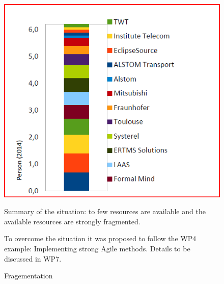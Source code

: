 \documentclass[a4paper, 11pt]{article}
\begin{document}
\begin{itemize}
\begin{figure}
\includegraphics[width=\textwidth]{Figures/Fragmentation.png}
\caption{Fragementation
\label{f:Availability}}

Summary of the situation: to few resources are available and the available resources are strongly fragmented. 

To overcome the situation it was proposed to follow the WP4 example: Implementing strong Agile methods. Details to be discussed in WP7.

\end{figure}

\end{itemize}
\end{document}
